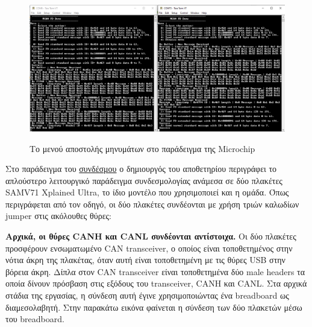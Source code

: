 \documentclass[a4paper,nobib,justified]{tufte-book}
\begin{document}
\begin{figure}[ht]
	\includegraphics[width=0.8\linewidth]{media/images/microchip-example-menu.png}
	\label{fig:microchip-example-menu}
	\caption[Το μενού αποστολής μηνυμάτων στο παράδειγμα της Microchip]{Το μενού αποστολής μηνυμάτων στο παράδειγμα της Microchip}
\end{figure}

\par Στο παράδειγμα του \href{https://github.com/Microchip-MPLAB-Harmony/csp_apps_sam_e70_s70_v70_v71/tree/master/apps/mcan/mcan_fd_operation_interrupt_timestamp}{συνδέσμου} ο δημιουργός του αποθετηρίου περιγράφει το απλούστερο λειτουργικό παράδειγμα συνδεσμολογίας ανάμεσα σε δύο πλακέτες SAMV71 Xplained Ultra, το ίδιο μοντέλο που χρησιμοποιεί και η ομάδα. Όπως περιγράφεται από τον οδηγό, οι δύο πλακέτες συνδέονται με χρήση τριών καλωδίων jumper στις ακόλουθες θύρες:

\par \textbf{Αρχικά, οι θύρες CANH και CANL συνδέονται αντίστοιχα.} Οι δύο πλακέτες προσφέρουν ενσωματωμένο CAN transceiver, ο οποίος είναι τοποθετημένος στην νότια άκρη της πλακέτας, όταν αυτή είναι τοποθετημένη με τις θύρες USB στην βόρεια άκρη. Δίπλα στον CAN transceiver είναι τοποθετημένα δύο male headers τα οποία δίνουν πρόσβαση στις εξόδους του transceiver, CANH και CANL. Στα αρχικά στάδια της εργασίας, η σύνδεση αυτή έγινε χρησιμοποιώντας ένα breadboard ως διαμεσολαβητή. Στην παρακάτω εικόνα φαίνεται η σύνδεση των δύο πλακετών μέσω του breadboard.
\end{document}
